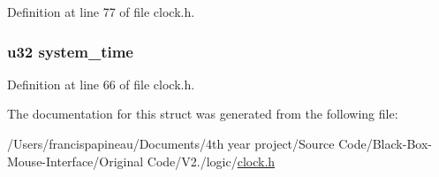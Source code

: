 \-Definition at line 77 of file clock.\-h.

\hypertarget{structtime_a6a2672b74bddd00613c7fc2b4cd92b3b}{
\subsubsection[{system\-\_\-time}]{\setlength{\rightskip}{0pt plus 5cm}u32 {\bf system\-\_\-time}}}\label{structtime_a6a2672b74bddd00613c7fc2b4cd92b3b}


\-Definition at line 66 of file clock.\-h.



\-The documentation for this struct was generated from the following file\-:\begin{DoxyCompactItemize}
\item 
/\-Users/francispapineau/\-Documents/4th year project/\-Source Code/\-Black-\/\-Box-\/\-Mouse-\/\-Interface/\-Original Code/\-V2./logic/\hyperlink{clock_8h}{clock.\-h}\end{DoxyCompactItemize}
